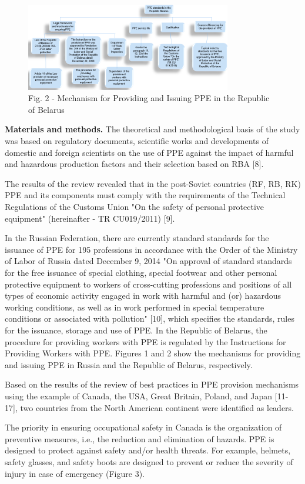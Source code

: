 \begin{figure}[H]
	\centering
	\includegraphics[width=0.8\textwidth]{media/chem2/image3}
	\caption*{Fig. 2 - Mechanism for Providing and Issuing PPE in the Republic of Belarus}
\end{figure}

\begin{multicols}{2}
{\bfseries Materials and methods.} The theoretical and methodological basis
of the study was based on regulatory documents, scientific works and
developments of domestic and foreign scientists on the use of PPE
against the impact of harmful and hazardous production factors and their
selection based on RBA {[}8{]}.

The results of the review revealed that in the post-Soviet countries
(RF, RB, RK) PPE and its components must comply with the requirements of
the Technical Regulations of the Customs Union "On the safety of
personal protective equipment" (hereinafter - TR CU019/2011) {[}9{]}.

In the Russian Federation, there are currently standard standards for
the issuance of PPE for 195 professions in accordance with the Order of
the Ministry of Labor of Russia dated December 9, 2014 "On approval of
standard standards for the free issuance of special clothing, special
footwear and other personal protective equipment to workers of
cross-cutting professions and positions of all types of economic
activity engaged in work with harmful and (or) hazardous working
conditions, as well as in work performed in special temperature
conditions or associated with pollution" {[}10{]}, which specifies the
standards, rules for the issuance, storage and use of PPE. In the
Republic of Belarus, the procedure for providing workers with PPE is
regulated by the Instructions for Providing Workers with PPE. Figures 1
and 2 show the mechanisms for providing and issuing PPE in Russia and
the Republic of Belarus, respectively.

Based on the results of the review of best practices in PPE provision
mechanisms using the example of Canada, the USA, Great Britain, Poland,
and Japan {[}11-17{]}, two countries from the North American continent
were identified as leaders.

The priority in ensuring occupational safety in Canada is the
organization of preventive measures, i.e., the reduction and elimination
of hazards. PPE is designed to protect against safety and/or health
threats. For example, helmets, safety glasses, and safety boots are
designed to prevent or reduce the severity of injury in case of
emergency (Figure 3).
\end{multicols}

